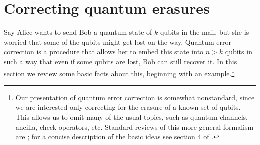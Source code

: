 \documentclass[11pt]{article}
\begin{document}
\section{Correcting quantum erasures}\label{qcorrsec}
Say Alice wants to send Bob a quantum state of $k$ qubits in the mail, but she is worried that some of the qubits might get lost on the way.  Quantum error correction is a procedure that allows her to embed this state into $n>k$ qubits in such a way that even if some qubits are lost, Bob can still recover it.  In this section we review some basic facts about this, beginning with an example.\footnote{Our presentation of quantum error correction is somewhat nonstandard, since we are interested only correcting for the erasure of a known set of qubits. This allows us to omit many of the usual topics, such as quantum channels, ancilla, check operators, etc.  Standard reviews of this more general formalism are \cite{preskillnotes,nielsen2010quantum}; for a concise description of the basic ideas see section 4 of \cite{Harlow:2013tf}.}
\end{document}
